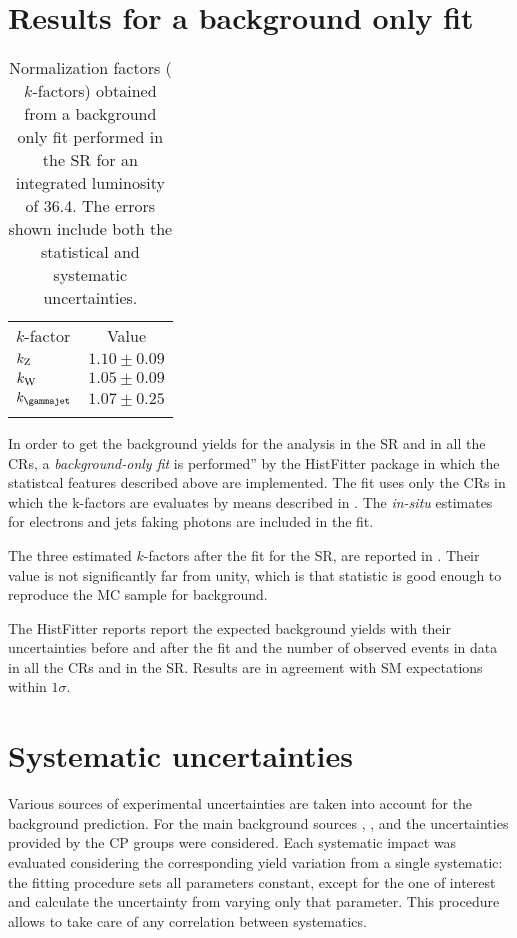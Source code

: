 \section{Results for a background only fit}
\begin{table}[t]
\centering
\begin{tabular}{lc}
\noalign{\smallskip}\toprule\noalign{\smallskip}
$k$-factor&Value\\
\noalign{\smallskip}\midrule\noalign{\smallskip}
$k_{\textup{Z}}$& $1.10\pm0.09$\\
$k_{\textup{W}}$& $1.05\pm0.09$\\
$k_{\textup{\gammajet}}$& $1.07\pm0.25$\\
\noalign{\smallskip}\bottomrule\noalign{\smallskip}
\end{tabular}
\caption{Normalization factors ($k$-factors) obtained from a background only fit performed in the SR for an integrated luminosity of \SI{36.4}{\ifb}. The errors shown include both the statistical and systematic uncertainties.}
\label{tab:kfactors}
\end{table}
In order to get the background yields for the analysis in the SR and in all the CRs, a \emph{background-only fit} is performed'' by the HistFitter package in which the statistcal features described above are implemented. The fit uses only the CRs in which the k-factors are evaluates by means described in \Sect{\ref{sec:kfactor}}. The \emph{in-situ} estimates for electrons and jets faking photons are included in the fit. 

The three estimated $k$-factors after the fit for the SR, are reported in \Tab{\ref{tab:kfactors}}. Their value is not significantly far from unity, which is that statistic is good enough to reproduce the MC sample for background.

The HistFitter \Tab{\ref{table.results.systematics.in.logL.fit.table.results.yields}} reports report the expected background yields with their uncertainties before and after the fit and the number of observed events in data in all the CRs and in the SR. Results are in agreement with SM expectations within $1\sigma$.



\section{Systematic uncertainties}
Various sources of experimental uncertainties are taken into account for the background prediction. For the main background sources \znng, \zg, \wg and \gj the uncertainties provided by the CP groups were considered. Each systematic impact was evaluated considering the corresponding yield variation from a single systematic: the fitting procedure sets all parameters constant, except for the one of interest and calculate the uncertainty from varying only that parameter. This procedure allows to take care of any correlation between systematics.


